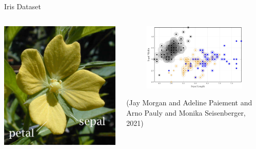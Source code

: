 \documentclass[smaller]{beamer}
\begin{document}
\begin{frame}[label={sec:orgd3afe91}]{Iris Dataset}
\begin{columns}
\begin{column}{0.3\columnwidth}
\begin{center}
\includegraphics[width=1.0\textwidth]{images/Petal-sepal.jpg}
\end{center}
\end{column}

\begin{column}{0.7\columnwidth}
\begin{figure}
    \centering
    \includegraphics[width=\textwidth]{images/iris-eps.png}
    \label{fig:iris}
\end{figure}

(Jay Morgan and Adeline Paiement and Arno Pauly and Monika Seisenberger, 2021)
\end{column}
\end{columns}
\end{frame}
\end{document}
